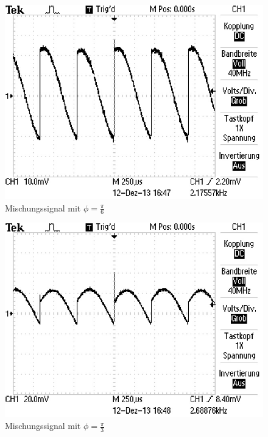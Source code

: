 		\begin{figure}[!h]
			\centering
			\includegraphics[scale=0.4]{Grafiken/Phase_2.jpg}
			\caption{Mischungssignal mit $\phi = \frac{\pi}{6}$}
			\label{fig:Phase2}
		\end{figure}
		
		\begin{figure}[!h]
			\centering
			\includegraphics[scale=0.4]{Grafiken/Phase_3.jpg}
			\caption{Mischungssignal mit $\phi = \frac{\pi}{3}$}
			\label{fig:Phase3}
		\end{figure}

